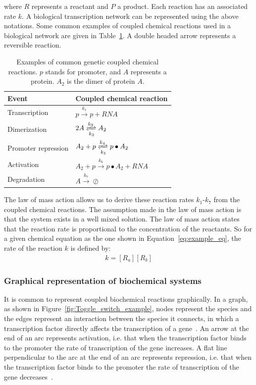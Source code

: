 \noindent where $R$ represents a reactant and $P$ a product. Each reaction has an associated rate $k$. A biological transcription network can be represented using the above notations. Some common examples of coupled chemical reactions used in a biological network are given in Table~\ref{tab:chem_reac_ex}. A double headed arrow represents a reversible reaction. 


\begin{table}[tb]
\centering
\caption{Examples of common genetic coupled chemical reactions. $p$ stands for promoter, and $A$ represents a protein. $A_2$ is the dimer of protein $A$.  }
\label{tab:chem_reac_ex}
\begin{tabular}{@{}ll@{}}
\toprule
Event & Coupled chemical reaction \\ \midrule
Transcription & $p  \xrightarrow{k_1} p + RNA$ \\
Dimerization & $2A \xrightleftharpoons[k_3]{k_2} A_2$ \\
Promoter repression & $A_2 + p \xrightleftharpoons[k_5]{k_4} p\bullet A_2$ \\
Activation & $A_2 + p \xrightarrow{k_6} p\bullet A_2 + RNA$ \\
Degradation & $A \xrightarrow{k_7}\oslash $ \\ \bottomrule
\end{tabular}
\end{table}

The law of mass action allows us to derive these reaction rates $k_1$-$k_7$ from the coupled chemical reactions. The assumption made in the law of mass action is that the system exists in a well mixed solution. The law of mass action states that the reaction rate is proportional to the concentration of the reactants. So for a given chemical equation as the one shown in Equation~\ref{eq:example_eq}, the rate of the reaction $k$ is defined by:
\begin{align*}
	k = [R_a][R_b]
\end{align*}



\subsubsection{Graphical representation of biochemical systems}

It is common to represent coupled biochemical reactions graphically. In a graph, as shown in Figure~\ref{fig:Toggle_switch_example}, nodes represent the species and the edges represent an interaction between the species it connects, in which a transcription factor directly affects the transcription of a gene~\autocite{Alon:2007}. An arrow at the end of an arc represents activation, i.e. that when the transcription factor binds to the promoter the rate of transcription of the gene increases. A flat line perpendicular to the arc at the end of an arc represents repression, i.e. that when the transcription factor binds to the promoter the rate of transcription of the gene decreases~\autocite{Alon:2007}.

